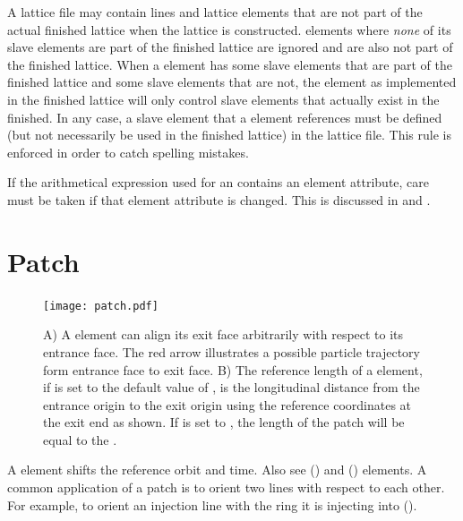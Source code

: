 {A lattice file may contain lines and lattice elements that are not part of the actual finished
lattice when the lattice is constructed.  elements where {\em none} of its slave elements
are part of the finished lattice are ignored and are also not part of the finished lattice.  When a
 element has some slave elements that are part of the finished lattice and some slave
elements that are not, the  element as implemented in the finished lattice will only
control slave elements that actually exist in the finished. In any case, a slave element that a
 element references must be defined (but not necessarily be used in the finished lattice)
in the lattice file. This rule is enforced in order to catch spelling mistakes.

If the arithmetical expression used for an  contains an element attribute, care must be
taken if that element attribute is changed. This is discussed in  and
.

\newpage

\section{Patch}
\label{s:patch}

\begin{figure}[tb]
  \centering
  \texttt{[image: patch.pdf]}
  \caption[Patch Element.]
{A) A  element can align its exit face arbitrarily with respect to its entrance face. The
red arrow illustrates a possible particle trajectory form entrance face to exit face. B) The
reference length of a  element, if  is set to the default value of
, is the longitudinal distance from the entrance origin to the exit origin using the
reference coordinates at the exit end as shown. If  is set to , the
length of the patch will be equal to the .}
  \label{f:patch}
\end{figure}


A  element shifts the reference orbit and time. Also see 
() and  () elements. A common application of a patch
is to orient two lines with respect to each other. For example, to orient an injection line with the
ring it is injecting into ().

}
